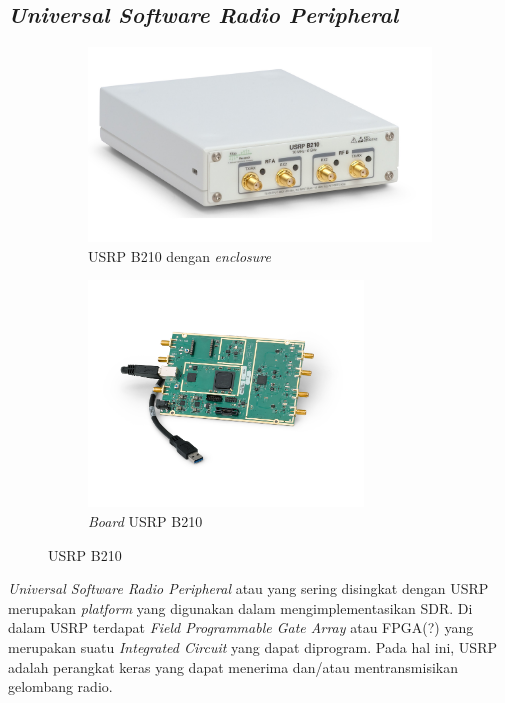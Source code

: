 \subsection{\textit{Universal Software Radio Peripheral}}
\begin{center}
	\begin{figure}[h!]
		\begin{subfigure}[b]{0.5\linewidth}
			\includegraphics[width=\linewidth]{pics/bab2/B210.jpg}
			\caption{USRP B210 dengan \textit{enclosure}}
		\end{subfigure}
		\begin{subfigure}[b]{0.5\linewidth}
			\includegraphics[width=7.3cm]{pics/bab2/B210Board.jpg}
			\caption{\textit{Board} USRP B210}
		\end{subfigure}
		\caption{USRP B210}
		\label{pic:gambarusrp}
	\end{figure}
\end{center}

\textit{Universal Software Radio Peripheral} atau yang sering disingkat dengan USRP merupakan \textit{platform} yang digunakan dalam mengimplementasikan SDR. Di dalam USRP terdapat \textit{Field Programmable Gate Array} atau FPGA(?) yang merupakan suatu \textit{Integrated Circuit} yang dapat diprogram. Pada hal ini, USRP adalah perangkat keras yang dapat menerima dan/atau mentransmisikan gelombang radio.

